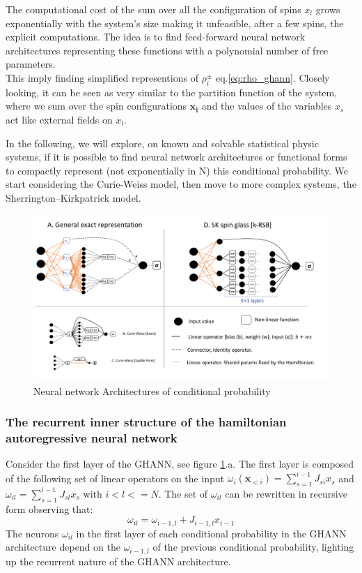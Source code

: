 \documentclass[aps,physrev,10pt,floatfix,longbibliography,nofootinbib,reprint]{revtex4-2}
\begin{document}
The computational cost of the sum over all the configuration of spins $x_l$ grows exponentially with the system's size making it unfeasible, after a few spins, the explicit computations. The idea is to find feed-forward neural network architectures representing these functions with a polynomial number of free parameters. \\
This imply finding simplified representions of $\rho_i^{\pm}$ eq.\ref{eq:rho_ghann}. Closely looking, it can be seen as very similar to the partition function of the system, where we sum over the spin configurations $\mathbf{x_l}$ and the values of the variables $x_s$ act like external fields on $x_l$.

In the following, we will explore, on known and solvable statistical physic systems, if it is possible to find neural network architectures or functional forms to compactly represent (not exponentially in N) this conditional probability. We start considering the Curie-Weiss model, then move to more complex systems, the Sherrington–Kirkpatrick model.

\begin{figure}[!h]
    \centering 
    \includegraphics[width=1\textwidth]{img/ann_img.pdf}
    \caption{Neural network Architectures of conditional probability}
    \label{fig:arch}
\end{figure}

\subsubsection{The recurrent inner structure of the hamiltonian autoregressive neural network}
\label{sec:inner_recurrent}
Consider the first layer of the GHANN, see figure \ref{fig:arch}.a. The first layer is composed of the following set of linear operators on the input $\omega_i(\mathbf{x}_{<i})=\sum_{s=1}^{i-1} J_{si} x_s$ and $\omega_{il}=\sum_{s=1}^{i-1} J_{sl} x_s$ with $i<l<=N$. The set of $\omega_{il}$ can be rewritten in recursive form observing that:
\begin{equation}
\omega_{il} = \omega_{i-1,l} + J_{i-1,l} x_{i-1}
\end{equation}
The neurons $\omega_{il}$ in the first layer of each conditional probability in the GHANN architecture depend on the $\omega_{i-1,l}$ of the previous conditional probability, lighting up the recurrent nature of the GHANN architecture. \\
\end{document}

